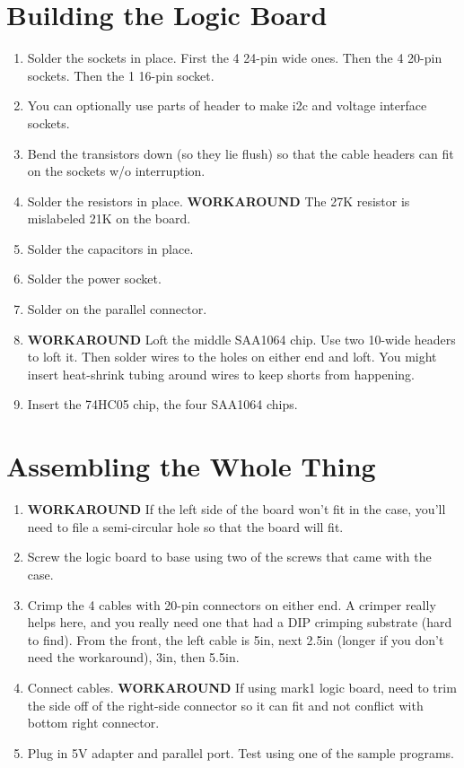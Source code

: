 \documentclass[11pt]{article}
\begin{document}
\section{Building the Logic Board}
\begin{enumerate}
\item Solder the sockets in place.  First the 4 24-pin wide ones.
      Then the 4 20-pin sockets.  Then the 1 16-pin socket.
\item You can optionally use parts of header to make i2c and voltage
      interface sockets.
\item Bend the transistors down (so they lie flush) so that the
      cable headers can fit on the sockets w/o interruption.
\item Solder the resistors in place.  
      {\bf WORKAROUND} The 27K resistor is mislabeled
      21K on the board.
\item Solder the capacitors in place.
\item Solder the power socket.
\item Solder on the parallel connector.

\item {\bf WORKAROUND} Loft the middle SAA1064 chip.  Use two 10-wide
      headers to loft it.  Then solder wires to the holes on either
      end and loft.  You might insert heat-shrink tubing around wires
      to keep shorts from happening.
\item Insert the 74HC05 chip, the four SAA1064 chips.

\end{enumerate}

\section{Assembling the Whole Thing}
\begin{enumerate}
\item {\bf WORKAROUND} If the left side of the board won't fit in the
      case, you'll need to file a semi-circular hole so that the board
      will fit.
\item Screw the logic board to base using two of the screws that
      came with the case.
\item Crimp the 4 cables with 20-pin connectors on either end.
      A crimper really helps here, and you really need one that
      had a DIP crimping substrate (hard to find).
      From the front, the left cable is 5in, next 2.5in (longer
      if you don't need the workaround), 3in, then 5.5in.      
\item Connect cables.  {\bf WORKAROUND}  If using mark1 logic board,
      need to trim the side off of the right-side connector
      so it can fit and not conflict with bottom right connector.
\item Plug in 5V adapter and parallel port.  Test using one
     of the sample programs.
\end{enumerate}
\end{document}
